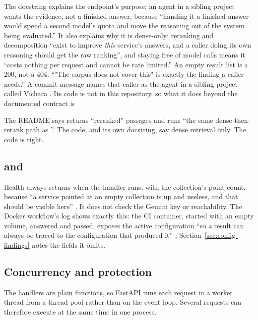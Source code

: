 The docstring explains the endpoint's purpose: an agent in a sibling project wants the evidence, not a finished answer, because \enquote{handing it a finished answer would spend a second model's quota and move the reasoning out of the system being evaluated.} It also explains why it is dense-only: reranking and decomposition \enquote{exist to improve \emph{this} service's answers, and a caller doing its own reasoning should get the raw ranking}, and staying free of model calls means it \enquote{costs nothing per request and cannot be rate limited.} An empty result list is a 200, not a 404: \enquote{"The corpus does not cover this" is exactly the finding a caller needs.} A commit message names that caller as the agent in a sibling project called Vichara . Its code is not in this repository, so what it does beyond the documented contract is \NotDet

\begin{finding}
The README says  returns \enquote{reranked} passages and runs \enquote{the same dense-then-rerank path as }. The code, and its own docstring, say dense retrieval only. The code is right.
\end{finding}

\subsection{ and }

Health always returns  when the handler runs, with the collection's point count, because \enquote{a service pointed at an empty collection is up and useless, and that should be visible here} . It does not check the Gemini key or reachability. The Docker workflow's log shows exactly this: the CI container, started with an empty volume, answered  and passed.  exposes the active configuration \enquote{so a result can always be traced to the configuration that produced it} ; Section~\ref{sec:config-findings} notes the fields it omits.

\subsection{Concurrency and protection}

\begin{background}
The handlers are plain  functions, so FastAPI runs each request in a worker thread from a thread pool rather than on the event loop. Several requests can therefore execute  at the same time in one process.
\end{background}

